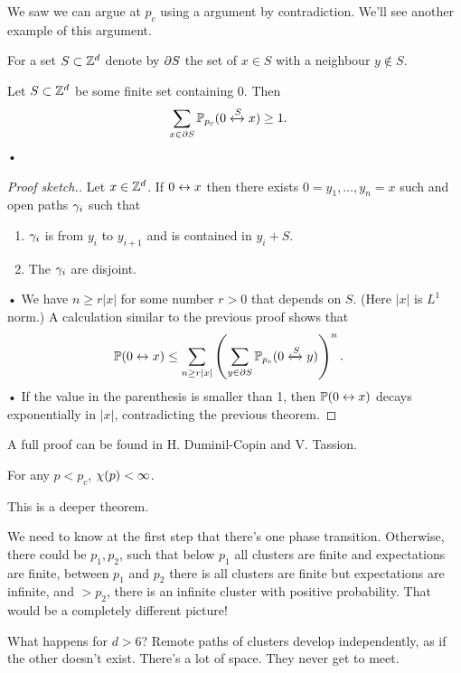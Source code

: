 We saw we can argue at $p_c$ using a argument by contradiction. We'll see another example of this argument.

For a set $S\subset \mathbb{Z}^d$ denote by $\partial S$ the set of $x\in S$ with a neighbour $y\nin S$. 
\begin{thm}
Let $S\subset \mathbb{Z}^d$ be some finite set containing 0. Then
\begin{align*}
\sum_{x\in \partial S} \mathbb{P}_{p_c} (0\xleftrightarrow{S} x) &\ge 1.
\end{align*}•
\end{thm}
\begin{proof}[Proof sketch.]
Let $x\in \mathbb{Z}^d$. If $0\leftrightarrow x$ then there exists $0=y_1,\ldots, y_n=x$ such and open paths $\gamma_i$ such that 
\begin{enumerate}
\item
$\gamma_i$ is from $y_i$ to $y_{i+1}$ and is contained in $y_i+S$.
\item 
The $\gamma_i$ are disjoint. 
\end{enumerate}•
We have $n\ge r|x|$ for some number $r>0$ that depends on $S$. (Here $|x|$ is $L^1$ norm.)
A calculation similar to the previous proof shows that
\begin{align*}
\mathbb{P}(0\leftrightarrow x) &\le \sum_{n\ge r|x|} \left( {\sum_{y\in \partial S} \mathbb{P}_{p_c}(0\xleftrightarrow{S} y)} \right)^n.
\end{align*}•
If the value in the parenthesis is smaller than 1, then $\mathbb{P}(0\leftrightarrow x)$ decays exponentially in $|x|$, contradicting the previous theorem.
\end{proof}

A full proof can be found in H. Duminil-Copin and V. Tassion. 

\begin{thm}
For any $p<p_c$, $\chi(p)<\infty$. 
\end{thm}
This is a deeper theorem.

We need to know at the first step that there's one phase transition. Otherwise, there could be $p_1,p_2$, such that below $p_1$ all clusters are finite and expectations are finite, between $p_1$ and $p_2$ there is all clusters are finite but expectations are infinite, and $>p_2$, there is an infinite cluster with positive probability. That would be a completely different picture!


What happens for $d>6$? %
Remote paths of clusters develop independently, as if the other doesn't exist. There's a lot of space. They never get to meet. 


